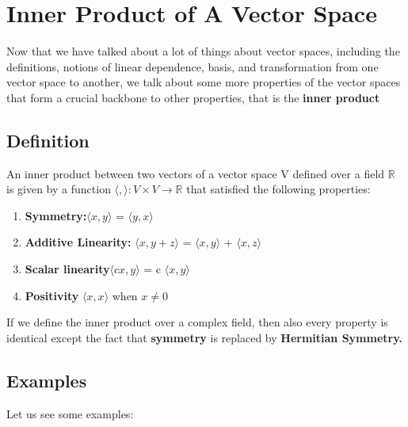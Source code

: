 \section{Inner Product of A Vector Space}

Now that we have talked about a lot of things about vector spaces, including the definitions, notions of linear dependence, basis, and transformation from one vector space to another, we talk about some more properties of the vector spaces that form a crucial backbone to other properties, that is the \textbf{inner product}


\subsection{Definition}
An inner product between two vectors of a vector space V defined over a field $\mathbb{R}$ is given by a function $\langle,\rangle: V \times V \to \mathbb{R}$ that satisfied the following properties:

\begin{enumerate}
    \item \textbf{Symmetry:}$\langle x,y \rangle$ = $\langle y,x \rangle$\
    \item \textbf{Additive Linearity:} $\langle x, y+z \rangle$ = $\langle x, y \rangle$ + $\langle x, z \rangle$
    \item \textbf{Scalar linearity}$\langle cx, y\rangle$ = c $\langle x, y \rangle$
    \item \textbf{Positivity} $\langle x,x \rangle$ when $x\neq 0$ 
    \end{enumerate}


If we define the inner product over a complex field, then also every property is identical except the fact that \textbf{symmetry} is replaced by \textbf{Hermitian Symmetry.}


\subsection{Examples}

Let us see some examples:

